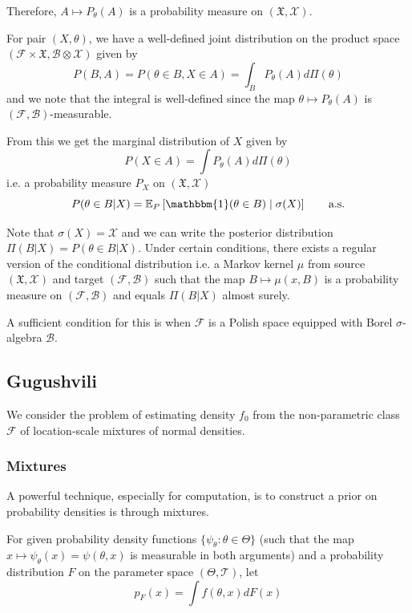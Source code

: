 \documentclass[a4paper,11pt]{article}
\theoremstyle{theorem}
\theoremstyle{definition}
\theoremstyle{remark}
\providecommand{\E}{\mathbb{E}}
\begin{document}
Therefore, $A \mapsto P_{\theta}(A)$ is a probability measure on $(\mathfrak{X}, \mathcal{X})$.

For pair $(X, \theta)$, we have a well-defined joint distribution on the product space $(\mathcal{F} \times \mathfrak{X}, \mathcal{B} \otimes \mathcal{X})$ given by
\[
P(B, A) = P(\theta \in B, X \in A) = \int_{B}{P_{\theta}(A)d\Pi(\theta)}
\]   
and we note that the integral is well-defined since the map $\theta \mapsto P_{\theta}(A)$ is $(\mathcal{F}, \mathcal{B})$-measurable.

From this we get the marginal distribution of $X$ given by
\[
P(X \in A) = \int{P_{\theta}(A)d\Pi(\theta)}
\]
i.e. a probability measure $P_{X}$ on $(\mathfrak{X}, \mathcal{X})$
\[
P(\theta \in B | X) = \E_{P} \left[ \mathbbm{1}(\theta \in B) \;|\; \sigma(X) \right] \qquad \text{a.s.}
\]

Note that $\sigma(X) = \mathcal{X}$ and we can write the posterior distribution $\Pi(B|X) = P(\theta \in B | X)$. Under certain conditions, there exists a regular version of the conditional distribution i.e. a Markov kernel $\mu$ from source $(\mathfrak{X}, \mathcal{X})$ and target $(\mathcal{F}, \mathcal{B})$ such that the map $B \mapsto \mu(x, B)$ is a probability measure on $(\mathcal{F}, \mathcal{B})$ and equals $\Pi(B|X)$ almost surely.   

A sufficient condition for this is when $\mathcal{F}$ is a Polish space equipped with Borel $\sigma$-algebra $\mathcal{B}$.


 
\subsection{Gugushvili}

We consider the problem of estimating density $f_{0}$ from the non-parametric class $\mathcal{F}$ of location-scale mixtures of normal densities.

\subsubsection{Mixtures} \label{mixtures}

A powerful technique, especially for computation, is to construct a prior on probability densities is through mixtures.

For given probability density functions $\{ \psi_{\theta} : \theta \in \Theta\}$ (such that the map $x \mapsto \psi_{\theta}(x) = \psi(\theta, x)$ is measurable in both arguments) and a probability distribution $F$ on the parameter space $(\Theta, \mathcal{T})$, let
\[
p_{F}(x) = \int{f(\theta, x) dF(x)}
\]
\end{document}
